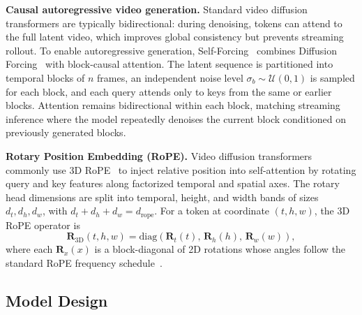 \documentclass{llmxive}
\begin{document}
\noindent\textbf{Causal autoregressive video generation.}
Standard video diffusion transformers are typically bidirectional: during denoising, tokens can attend to the full latent video, which improves global consistency but prevents streaming rollout.
To enable autoregressive generation, Self-Forcing~\cite{huang2025self} combines Diffusion Forcing~\cite{chen2024diffusion} with block-causal attention.
The latent sequence is partitioned into temporal blocks of $n$ frames, an independent noise level $\sigma_b\sim\mathcal{U}(0,1)$ is sampled for each block, and each query attends only to keys from the same or earlier blocks.
Attention remains bidirectional within each block, matching streaming inference where the model repeatedly denoises the current block conditioned on previously generated blocks.

\noindent\textbf{Rotary Position Embedding (RoPE).}
Video diffusion transformers commonly use 3D RoPE~\cite{rope} to inject relative position into self-attention by rotating query and key features along factorized temporal and spatial axes.
The rotary head dimensions are split into temporal, height, and width bands of sizes $d_t,d_h,d_w$, with $d_t+d_h+d_w=d_{\mathrm{rope}}$.
For a token at coordinate $(t,h,w)$, the 3D RoPE operator is
\begin{equation}
\mathbf{R}_{\mathrm{3D}}(t,h,w)
=
\mathrm{diag}\!\left(\mathbf{R}_{t}(t),\,\mathbf{R}_{h}(h),\,\mathbf{R}_{w}(w)\right),
\end{equation}
where each $\mathbf{R}_x(x)$ is a block-diagonal of 2D rotations whose angles follow the standard RoPE frequency schedule~\cite{rope}.




\subsection{Model Design}
\label{sec:model-design}
\end{document}
